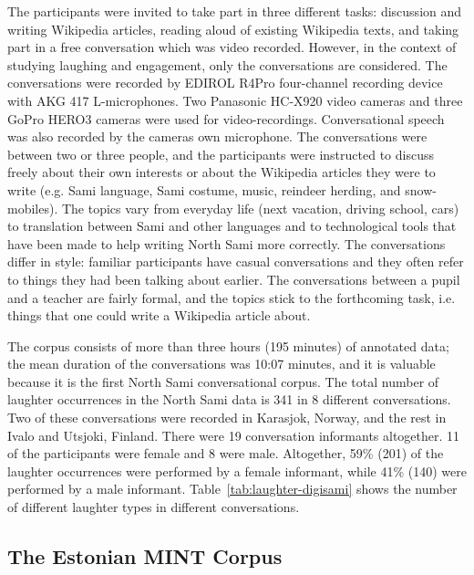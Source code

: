 \documentclass[10pt,journal,compsoc]{IEEEtran}
\begin{document}
The participants were invited to take part in three different tasks: discussion and writing Wikipedia articles, reading aloud of existing Wikipedia texts, and taking part in a free conversation which was video recorded. However, in the context of studying laughing and engagement, only the conversations are considered.
The conversations were recorded by EDIROL R4Pro four-channel recording device with AKG 417 L-microphones. Two Panasonic HC-X920 video cameras and three GoPro HERO3 cameras were used for video-recordings. Conversational speech was also recorded by the cameras own microphone. The conversations were between two or three people, and the participants were instructed to discuss freely about their own interests or about the Wikipedia articles they were to write (e.g. Sami language, Sami costume, music, reindeer herding, and snow-mobiles). The topics vary from everyday life (next vacation, driving school, cars) to translation between Sami and other languages and to technological tools that have been made to help writing North Sami more correctly. The conversations differ in style: familiar participants have casual conversations and they often refer to things they had been talking about earlier. The conversations between a pupil and a teacher are fairly formal, and the topics stick to the forthcoming task, i.e. things that one could write a Wikipedia article about.

The corpus consists of more than three hours (195 minutes) of annotated data; the mean duration of the conversations was 10:07 minutes, and it is valuable because it is the first North Sami conversational corpus. The total number of laughter occurrences in the North Sami data is 341 in 8 different conversations. Two of these conversations were recorded in Karasjok, Norway, and the rest in Ivalo and Utsjoki, Finland. There were 19 conversation informants altogether. 11 of the participants were female and 8 were male. Altogether, 59\% (201) of the laughter occurrences were performed by a female informant, while 41\% (140) were performed by a male informant. Table~\ref{tab:laughter-digisami} shows the number of different laughter types in different conversations.

\subsection{The Estonian MINT Corpus}
\label{sec:estonian-mint-corpus}
\end{document}

